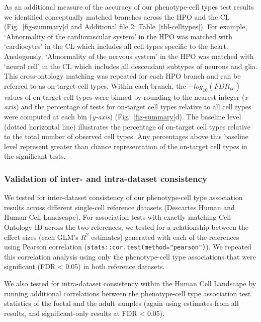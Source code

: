\documentclass[
]{article}
\begin{document}
As an additional measure of the accuracy of our phenotype-cell types
test results we identified conceptually matched branches across the HPO
and the CL (Fig.~\ref{fig-summary}d and Additional file 2:
Table~\ref{tbl-celltypes}). For example, `Abnormality of the
cardiovascular system' in the HPO was matched with `cardiocytes' in the
CL which includes all cell types specific to the heart. Analogously,
`Abnormality of the nervous system' in the HPO was matched with `neural
cell' in the CL which includes all descendant subtypes of neurons and
glia. This cross-ontology matching was repeated for each HPO branch and
can be referred to as on-target cell types. Within each branch, the
\(-log_{10}(FDR _{pc})\) values of on-target cell types were binned by
rounding to the nearest integer (\emph{x-axis}) and the percentage of
tests for on-target cell types relative to all cell types were computed
at each bin (\emph{y-axis}) (Fig.~\ref{fig-summary}d). The baseline
level (dotted horizontal line) illustrates the percentage of on-target
cell types relative to the total number of observed cell types. Any
percentages above this baseline level represent greater than chance
representation of the on-target cell types in the significant tests.

\subsubsection{Validation of inter- and intra-dataset
consistency}\label{validation-of-inter--and-intra-dataset-consistency}

We tested for inter-dataset consistency of our phenotype-cell type
association results across different single-cell reference datasets
(Descartes Human and Human Cell Landscape). For association tests with
exactly matching Cell Ontology ID across the two references, we tested
for a relationship between the effect sizes (each GLM's \(R^2\)
estimates) generated with each of the references using Pearson
correlation (\texttt{stats::cor.test(method="pearson")}). We repeated
this correlation analysis using only the phenotype-cell type
associations that were significant (FDR \textless{} 0.05) in both
reference datasets.

We also tested for intra-dataset consistency within the Human Cell
Landscape by running additional correlations between the phenotype-cell
type association test statistics of the foetal and the adult samples
(again using estimates from all results, and significant-only results at
FDR \textless{} 0.05).
\end{document}
